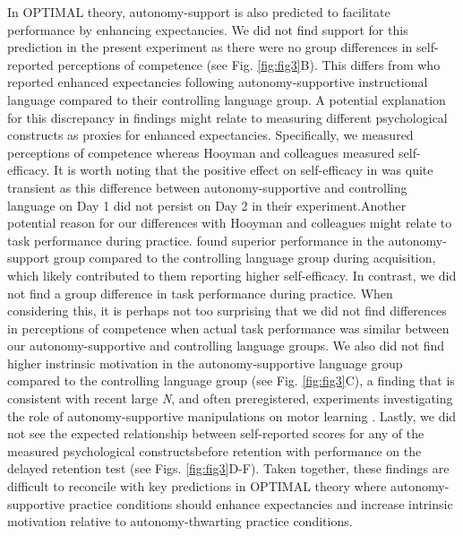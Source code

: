 \documentclass[doc,floatsintext,donotrepeattitle,letterpaper,12pt]{apa7}
\begin{document}
In OPTIMAL theory, autonomy-support is also predicted to facilitate performance by enhancing expectancies. We did not find support for this prediction in the present experiment as there were no group differences in self-reported perceptions of competence (see Fig. \ref{fig:fig3}B). This differs from \textcite{hooyman2014} who reported enhanced expectancies following autonomy-supportive instructional language compared to their controlling language group. A potential explanation for this discrepancy in findings might relate to measuring different psychological constructs as proxies for enhanced expectancies. Specifically, we measured perceptions of competence whereas Hooyman and colleagues measured self-efficacy. It is worth noting that the positive effect on self-efficacy in \textcite{hooyman2014} was quite transient as this difference between autonomy-supportive and controlling language on Day 1 did not persist on Day 2 in their experiment.\footnotemark Another potential reason for our differences with Hooyman and colleagues might relate to task performance during practice. \textcite{hooyman2014} found superior performance in the autonomy-support group compared to the controlling language group during acquisition, which likely contributed to them reporting higher self-efficacy. In contrast, we did not find a group difference in task performance during practice. When considering this, it is perhaps not too surprising that we did not find differences in perceptions of competence when actual task performance was similar between our autonomy-supportive and controlling language groups. We also did not find higher instrinsic motivation in the autonomy-supportive language group compared to the controlling language group (see Fig. \ref{fig:fig3}C), a finding that is consistent with recent large \emph{N}, and often preregistered, experiments investigating the role of autonomy-supportive manipulations on motor learning \autocite[e.g.,][]{bacelar2022,stgermain2022,stgermain2023}. Lastly, we did not see the expected relationship between self-reported scores for any of the measured psychological constructsbefore retention with performance on the delayed retention test (see Figs. \ref{fig:fig3}D-F). Taken together, these findings are difficult to reconcile with key predictions in OPTIMAL theory \autocite{wulf2016} where autonomy-supportive practice conditions should enhance expectancies and increase intrinsic motivation relative to autonomy-thwarting practice conditions.
\end{document}
